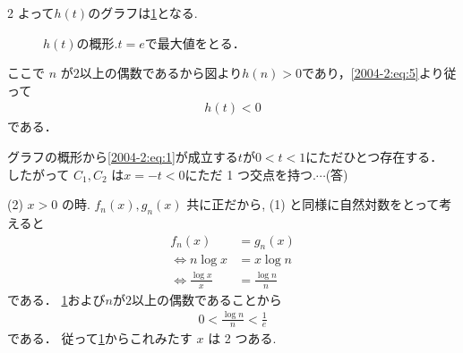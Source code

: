 \documentclass[../../main.tex]{subfiles}
\begin{document}
\begin{multicols}{2}
  よって$h(t)$のグラフは\cref{2004-2:fig:1}となる.

  \begin{figure}[H]
    \caption{$h(t)$の概形.$t=e$で最大値をとる．}
    \label{2004-2:fig:1}
  \end{figure}

  ここで $n$ が$2$以上の偶数であるから図より$h(n)>0$であり，\cref{2004-2:eq:5}より従って
  \begin{align*}
    h(t) < 0
  \end{align*}
  である．

  グラフの概形から\cref{2004-2:eq:1}が成立する$t$が$0<t<1$にただひとつ存在する．
  したがって $C_1, C_2$ は$x= -t<0$にただ 1 つ交点を持つ.$\cdots$(答)

  \vspace{10pt}
  (2)
  $x>0$ の時. $f_n(x), g_n(x)$ 共に正だから, (1) と同様に自然対数をとって考えると
  \begin{align*}
    f_n(x)           & = g_n(x)           \\
    \iff
    n \log x         & = x \log n         \\
    \iff
    \frac{\log x}{x} & = \frac{\log n}{n}
  \end{align*}
  である．
  \cref{2004-2:fig:1}および$n$が$2$以上の偶数であることから
  \begin{align*}
    0 < \frac{\log n}{n} < \frac{1}{e}
  \end{align*}
  である．
  従って\cref{2004-2:fig:1}からこれみたす $x$ は 2 つある.


\end{multicols}
\end{document}
